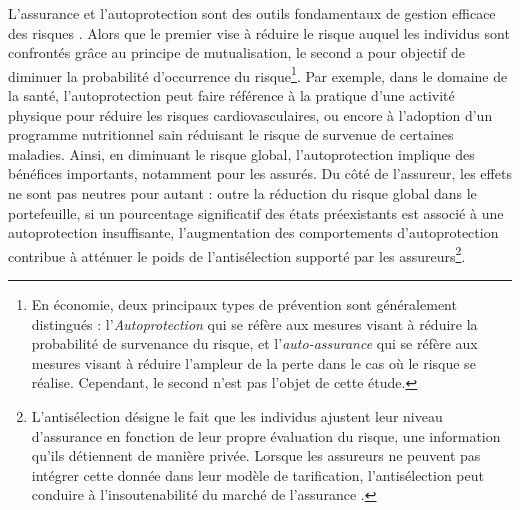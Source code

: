 \begin{Article}
\begin{refsection}[Mouminoux]
L'assurance et l'autoprotection sont des outils fondamentaux de gestion efficace des risques \parencite{WorldBank2013}. Alors que le premier vise à réduire le risque auquel les individus sont confrontés grâce au principe de mutualisation, le second a pour objectif de diminuer la probabilité d'occurrence du risque\footnote{En économie, deux principaux types de prévention sont généralement distingués \parencite{eb72} : l'\textit{Autoprotection} qui se réfère aux mesures visant à réduire la probabilité de survenance du risque, et l'\textit{auto-assurance} qui se réfère aux mesures visant à réduire l'ampleur de la perte dans le cas où le risque se réalise. Cependant, le second n'est pas l'objet de cette étude.}. Par exemple, dans le domaine de la santé, l'autoprotection peut faire référence à la pratique d'une activité physique pour réduire les risques cardiovasculaires, ou encore à l'adoption d'un programme nutritionnel sain réduisant le risque de survenue de certaines maladies. Ainsi, en diminuant le risque global, l'autoprotection implique des bénéfices importants, notamment pour les assurés. Du côté de l'assureur, les effets ne sont pas neutres pour autant : outre la réduction du risque global dans le portefeuille, si un pourcentage significatif des états préexistants est associé à une autoprotection insuffisante, l'augmentation des comportements d'autoprotection contribue à atténuer le poids de l'antisélection supporté par les assureurs\footnote{L'antisélection désigne le fait que les individus ajustent leur niveau d'assurance en fonction de leur propre évaluation du risque, une information qu'ils détiennent de manière privée. Lorsque les assureurs ne peuvent pas intégrer cette donnée dans leur modèle de tarification, l'antisélection peut conduire à l'insoutenabilité du marché de l'assurance \parencite{rs76}.}.


\end{refsection}
\end{Article}
